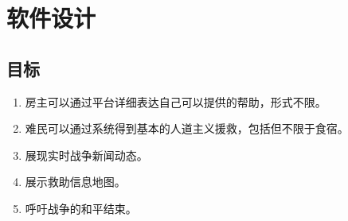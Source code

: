 \chapter{软件设计}

\section{目标}
\begin{enumerate}
    \item 房主可以通过平台详细表达自己可以提供的帮助，形式不限。
    \item 难民可以通过系统得到基本的人道主义援救，包括但不限于食宿。
    \item 展现实时战争新闻动态。
    \item 展示救助信息地图。
    \item 呼吁战争的和平结束。
\end{enumerate}

